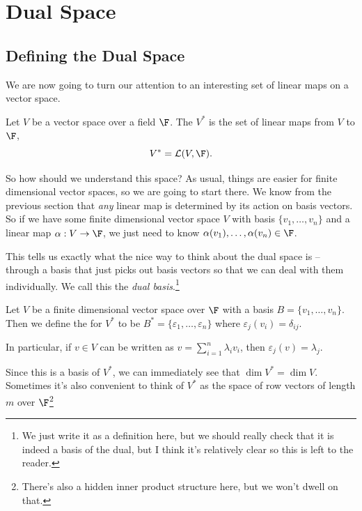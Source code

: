 \section{Dual Space}

\subsection{Defining the Dual Space}

We are now going to turn our attention to an interesting set of linear maps on a vector space.

\begin{definition}
    Let $V$ be a vector space over a field $\F$. The  $V^*$ is the set of linear maps from $V$ to $\F$,
    $$
    V^* = \mathcal{L}(V, \F).
    $$
\end{definition}

So how should we understand this space?
As usual, things are easier for finite dimensional vector spaces, so we are going to start there. We know from the previous section that \emph{any} linear map is determined by its action on basis vectors. So if we have some finite dimensional vector space $V$ with basis $\{v_1, \dots, v_n\}$ and a linear map $\alpha: V \rightarrow \F$, we just need to know $\alpha(v_1), \dots, \alpha(v_n) \in \F$.

This tells us exactly what the nice way to think about the dual space is -- through a basis that just picks out basis vectors so that we can deal with them individually. We call this the \emph{dual basis}.\footnote{We just write it as a definition here, but we should really check that it is indeed a basis of the dual, but I think it's relatively clear so this is left to the reader.}

\begin{definition}
    Let $V$ be a finite dimensional vector space over $\F$ with a basis $B = \{v_1, \dots, v_n\}$. 
    Then we define the  for $V^*$ to be $B^* = \{\varepsilon_1, \dots, \varepsilon_n\}$ where $\varepsilon_j(v_i) = \delta_{ij}$.

    In particular, if $v \in V$ can be written as $v = \sum_{i = 1}^n \lambda_i v_i$, then $\varepsilon_j(v) = \lambda_j$.
\end{definition}

Since this is a basis of $V^*$, we can immediately see that $\dim V^* = \dim V$. Sometimes it's also convenient to think of $V^*$ as the space of row vectors of length $m$ over $\F$\footnote{There's also a hidden inner product structure here, but we won't dwell on that.}

